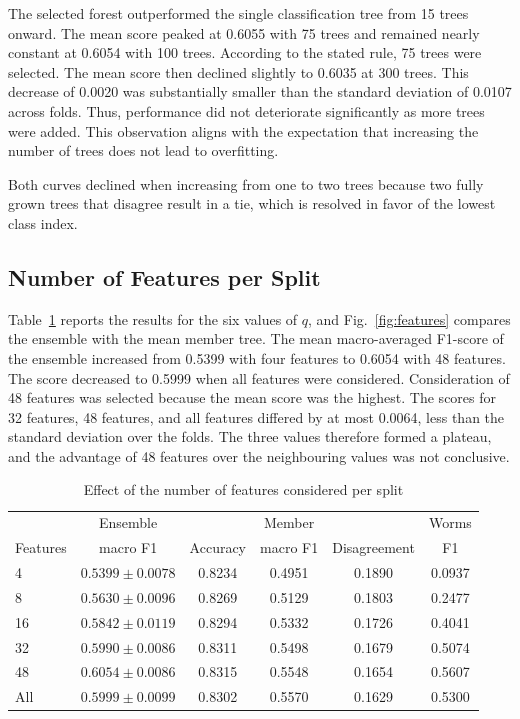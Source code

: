 \documentclass[conference]{IEEEtran}
\begin{document}
The selected forest outperformed the single classification tree from 15 trees onward. The mean score peaked at 0.6055 with 75 trees and remained nearly constant at 0.6054 with 100 trees. According to the stated rule, 75 trees were selected. The mean score then declined slightly to 0.6035 at 300 trees. This decrease of 0.0020 was substantially smaller than the standard deviation of 0.0107 across folds. Thus, performance did not deteriorate significantly as more trees were added. This observation aligns with the expectation that increasing the number of trees does not lead to overfitting.

Both curves declined when increasing from one to two trees because two fully grown trees that disagree result in a tie, which is resolved in favor of the lowest class index.

\subsection{Number of Features per Split}

Table~\ref{tab:features} reports the results for the six values of $q$, and Fig.~\ref{fig:features} compares the ensemble with the mean member tree. The mean macro-averaged F1-score of the ensemble increased from 0.5399 with four features to 0.6054 with 48 features. The score decreased to 0.5999 when all features were considered. Consideration of 48 features was selected because the mean score was the highest. The scores for 32 features, 48 features, and all features differed by at most 0.0064, less than the standard deviation over the folds. The three values therefore formed a plateau, and the advantage of 48 features over the neighbouring values was not conclusive.

\begin{table}[!t]
\caption{Effect of the number of features considered per split}
\label{tab:features}
\centering
\setlength{\tabcolsep}{3.5pt}
\begin{tabular}{@{}lccccc@{}}
\toprule
 & Ensemble & & Member & & Worms \\
Features & macro F1 & Accuracy & macro F1 & Disagreement & F1 \\
\midrule
4 & $0.5399\pm0.0078$ & 0.8234 & 0.4951 & 0.1890 & 0.0937 \\
8 & $0.5630\pm0.0096$ & 0.8269 & 0.5129 & 0.1803 & 0.2477 \\
16 & $0.5842\pm0.0119$ & 0.8294 & 0.5332 & 0.1726 & 0.4041 \\
32 & $0.5990\pm0.0086$ & 0.8311 & 0.5498 & 0.1679 & 0.5074 \\
48 & $0.6054\pm0.0086$ & 0.8315 & 0.5548 & 0.1654 & 0.5607 \\
All & $0.5999\pm0.0099$ & 0.8302 & 0.5570 & 0.1629 & 0.5300 \\
\bottomrule
\end{tabular}
\end{table}
\end{document}
